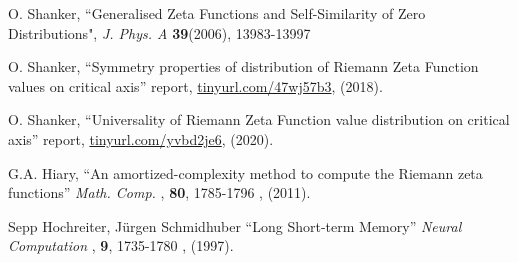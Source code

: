 \documentclass[twoside]{article}
\begin{document}
\begin{thebibliography}{10}
 O. Shanker, 
``Generalised Zeta Functions and Self-Similarity of Zero Distributions",
{\it J.  Phys. A} {\bf39}(2006), 13983-13997

 O. Shanker, 
``Symmetry properties of distribution of Riemann Zeta Function values on critical axis''
 report,
\url{tinyurl.com/47wj57b3}, 
(2018). 

 O. Shanker, 
``Universality of Riemann Zeta Function value distribution on critical axis''
 report,
\url{tinyurl.com/yvbd2je6}, 
(2020). 

 G.A. Hiary, 
``An amortized-complexity method to compute the Riemann zeta functions''
{\it  Math. Comp. }, {\bf 80},  1785-1796 , (2011). 

 Sepp Hochreiter,  Jürgen Schmidhuber 
``Long Short-term Memory''
{\it  Neural Computation }, {\bf 9},  1735-1780 , (1997). 



\end{thebibliography} 
\end{document}
